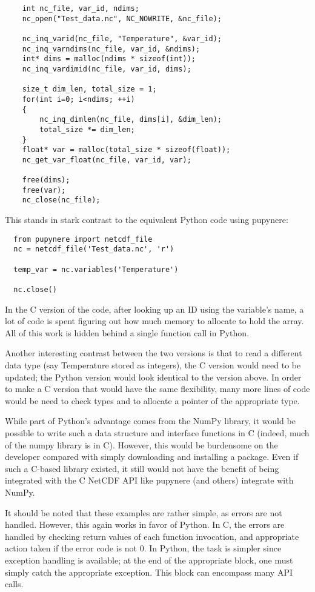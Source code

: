 \documentclass[twocolumn]{article}
\begin{document}
  \lstset{language=C}
  \begin{lstlisting}
    int nc_file, var_id, ndims;
    nc_open("Test_data.nc", NC_NOWRITE, &nc_file);

    nc_inq_varid(nc_file, "Temperature", &var_id);
    nc_inq_varndims(nc_file, var_id, &ndims);
    int* dims = malloc(ndims * sizeof(int));
    nc_inq_vardimid(nc_file, var_id, dims);

    size_t dim_len, total_size = 1;
    for(int i=0; i<ndims; ++i)
    {
        nc_inq_dimlen(nc_file, dims[i], &dim_len);
        total_size *= dim_len;
    }
    float* var = malloc(total_size * sizeof(float));
    nc_get_var_float(nc_file, var_id, var);
 
    free(dims);
    free(var);
    nc_close(nc_file);
  \end{lstlisting}
This stands in stark contrast to the equivalent Python code using pupynere:
  \lstset{language=Python}
  \begin{lstlisting}
  from pupynere import netcdf_file
  nc = netcdf_file('Test_data.nc', 'r')

  temp_var = nc.variables('Temperature')

  nc.close()
  \end{lstlisting}
In the C version of the code, after looking up an ID using the variable's name,
a lot of code is spent figuring out how much memory to allocate to hold the
array.  All of this work is hidden behind a single function call in Python.

Another interesting contrast between the two versions is that to read a different
data type (say Temperature stored as integers), the C version would need to be
updated; the Python version would look identical to the version above. In order
to make a C version that would have the same flexibility, many more lines of
code would be need to check types and to allocate a pointer of the appropriate
type.

While part of Python's advantage comes from  the NumPy library, it would
be possible to write such a data structure and interface functions in C (indeed,
much of the numpy library is in C). However, this would be burdensome on the developer
compared with simply downloading and installing a package. Even if such a C-based
library existed, it still would not have the benefit of being integrated with
the C NetCDF API like pupynere (and others) integrate with NumPy.

It should be noted that these examples are rather simple, as errors are not
handled. However, this again works in favor of Python. In C, the errors are
handled by checking return values of each function invocation, and appropriate
action taken if the error code is not 0. In Python, the task is simpler
since exception handling is available; at the end of the appropriate block, 
one must simply catch the appropriate exception. This block can encompass
many API calls.
\end{document}
